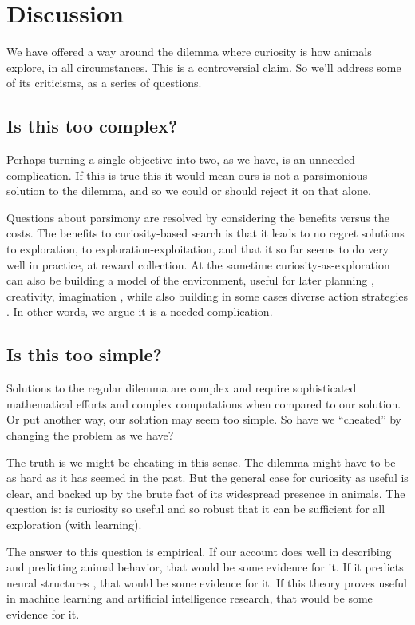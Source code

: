 \section{Discussion}
We have offered a way around the dilemma where curiosity is how animals explore, in all circumstances. This is a controversial claim. So we'll address some of its criticisms, as a series of questions.


\subsection*{Is this too complex?}
Perhaps turning a single objective into two, as we have, is an unneeded complication. If this is true this it would mean ours is not a parsimonious solution to the dilemma, and so we could or should reject it on that alone. 

Questions about parsimony are resolved by considering the benefits versus the costs. The benefits to curiosity-based search is that it leads to no regret solutions to exploration, to exploration-exploitation, and that it so far seems to do very well in practice, at reward collection. At the sametime curiosity-as-exploration can also be building a model of the environment, useful for later planning \cite{Ahilan2019,Poucet1993}, creativity, imagination \cite{Schmidhuber2010}, while also building in some cases diverse action strategies \cite{Lehman2011a,Lehman2013,Mouret2015,Colas2020}. In other words, we argue it is a needed complication. 


\subsection*{Is this too simple?}
Solutions to the regular dilemma are complex and require sophisticated mathematical efforts and complex computations when compared to our solution. Or put another way, our solution may seem too simple. So have we ``cheated'' by changing the problem as we have?

The truth is we might be cheating in this sense. The dilemma might have to be as hard as it has seemed in the past. But the general case for curiosity as useful is clear, and backed up by the brute fact of its widespread presence in animals. The question is: is curiosity so useful and so robust that it can be sufficient for all exploration (with learning). 

The answer to this question is empirical. If our account does well in describing and predicting animal behavior, that would be some evidence for it. If it predicts neural structures \cite{Cisek2019}, that would be some evidence for it. If this theory proves useful in machine learning and artificial intelligence research, that would be some evidence for it.


